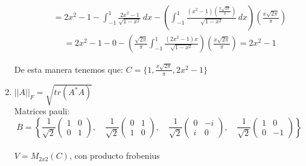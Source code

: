\documentclass{report}
\begin{document}
\begin{enumerate}
\begin{itemize}
            \begin{align*}
            &= 2x^2 - 1 - \int_{-1}^1 \frac{2x^2 - 1}{\sqrt{1-x^2}} \, dx - \left(\int_{-1}^1 \frac{(x^2 - 1)\left(\frac{x\sqrt{2\pi}}{\pi}\right)}{\sqrt{1-x^2}} \, dx\right)\left( \frac{x\sqrt{2\pi}}{\pi}\right)
            \end{align*}
            \begin{align*}
            &= 2x^2-1-0-\left(\frac{\sqrt{2\pi}}{\pi}\int_{-1}^1\frac{(2x^2-1)x}{\sqrt{1-x^2}}\right)\left(\frac{x\sqrt{2\pi}}{\pi}\right)=2x^2-1
            \end{align*}
        \end{itemize}
    
      De esta manera tenemos que: $C=\{1,\frac{x\sqrt{2\pi}}{\pi},2x^2-1\}$
    \begin{figure}[h]
    \centering
    

    \begin{center}
    \end{center}
    
    
    \end{figure}
        \item $||A||_F=\sqrt{tr(A^*A)}$\\
    
        Matrices pauli: $$B=\left\{
      \frac{1}{\sqrt{2}}\begin{pmatrix}
    1 & 0\\
    0 & 1
    \end{pmatrix}, \quad
    \frac{1}{\sqrt{2}}\begin{pmatrix}
    0 & 1 \\
    1 & 0
    \end{pmatrix}, \quad
    \frac{1}{\sqrt{2}} \begin{pmatrix}
    0 & -i \\
    i & 0
    \end{pmatrix}, \quad
    \frac{1}{\sqrt{2}} \begin{pmatrix}
    1 & 0 \\
    0 & -1
    \end{pmatrix}\right\}
    $$    
    \\$V=M_{2x2}(C)$, con producto frobenius
    

\end{enumerate}
\end{document}
